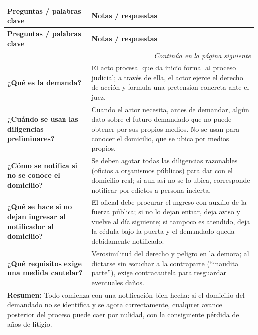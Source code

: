 \documentclass[12pt,oneside]{book}
\begin{document}
\begin{longtable}{
    p{}
    p{}
}
\toprule
\textbf{Preguntas / palabras clave} & \textbf{Notas / respuestas} \\
\midrule
\endfirsthead
\toprule
\textbf{Preguntas / palabras clave} & \textbf{Notas / respuestas} \\
\midrule
\endhead
\midrule
\multicolumn{2}{r}{\textit{Continúa en la página siguiente}} \\
\endfoot
\bottomrule
\endlastfoot

\textbf{¿Qué es la demanda?} &
El acto procesal que da inicio formal al proceso judicial; a través de ella, el actor ejerce el derecho de acción y formula una pretensión concreta ante el juez. \\

\textbf{¿Cuándo se usan las diligencias preliminares?} &
Cuando el actor necesita, antes de demandar, algún dato sobre el futuro demandado que no puede obtener por sus propios medios. No se usan para conocer el domicilio, que se ubica por medios propios. \\

\textbf{¿Cómo se notifica si no se conoce el domicilio?} &
Se deben agotar todas las diligencias razonables (oficios a organismos públicos) para dar con el domicilio real; si aun así no se lo ubica, corresponde notificar por edictos a persona incierta. \\

\textbf{¿Qué se hace si no dejan ingresar al notificador al domicilio?} &
El oficial debe procurar el ingreso con auxilio de la fuerza pública; si no lo dejan entrar, deja aviso y vuelve al día siguiente; si tampoco es atendido, deja la cédula bajo la puerta y el demandado queda debidamente notificado. \\

\textbf{¿Qué requisitos exige una medida cautelar?} &
Verosimilitud del derecho y peligro en la demora; al dictarse sin escuchar a la contraparte (``inaudita parte''), exige contracautela para resguardar eventuales daños. \\

\midrule
\multicolumn{2}{p{\dimexpr\textwidth-2\tabcolsep\relax}}{
\textbf{Resumen:} Todo comienza con una notificación bien hecha: si el domicilio del demandado no se identifica y se agota correctamente, cualquier avance posterior del proceso puede caer por nulidad, con la consiguiente pérdida de años de litigio.
} \\

\end{longtable}
\end{document}
